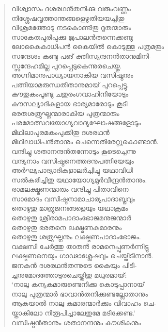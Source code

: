\begin{verse}
വിശ്വാസം ദശരഥന്‍തനിക്കു വരുംവണ്ണം\\
നിശ്ശേഷവൃത്താന്തങ്ങളെഴുതിയയച്ചിതു\\
വിശ്രമത്തോടു നടകൊണ്ടിതു ദൂതന്മാരും\\
സാകേതപുരിപുക്കു ഭൂപാലന്‍തന്നെക്കണ്ടു\\
ലോകൈകാധിപന്‍ കൈയില്‍ കൊടുത്തു പത്രമതും\\
സന്ദേശം കണ്ടു പങ് ക്തിസ്യന്ദനന്‍താനുമിനി-\\
സ്സന്ദേഹമില്ല പുറപ്പെടുകെന്നുരചെയ്തു.\\
അഗ്നിമാനുപാധ്യായനാകിയ വസിഷ്ഠനും\\
പത്നിയാമരുന്ധതിതാനുമായ് പുറപ്പെട്ടു.\\
കൗതുകംപൂണ്ടു ചതുരംഗവാഹിനിയോടും\\
കൗസല്യാദികളായ ഭാര്യമാരോടും കൂടി\\
ഭരതശത്രുഘ്നന്മാരാകിയ പുത്രന്മാരും\\
പരമോത്സവയോഗ്യവാദ്യഘോഷങ്ങളോടും\\
മിഥിലാപുരമകംപുക്കിതു ദശരഥന്‍\\
മിഥിലാധിപന്‍താനും ചെന്നെതിരേറ്റുകൊണ്ടാന്‍.\\
വന്ദിച്ചു ശതാനന്ദന്‍തന്നോടും കൂടെച്ചെന്നു\\
വന്ദ്യനാം വസിഷ്ഠനെത്തദനുപത്നിയേയും\\
അര്‍ഘ്യപാദ്യാദികളാലര്‍ച്ചിച്ചു യഥാവിധി\\
സല്‍കരിച്ചിതു യഥായോഗ്യമുര്‍വീന്ദ്രന്‍താനും.\\
രാമലക്ഷ്മണന്മാരും വന്ദിച്ചു പിതാവിനെ-\\
സാമോദം വസിഷ്ഠനാമാചാര്യപാദാബ്ജവും\\
തൊഴുതു മാത്രുജനങ്ങളെയും യഥാക്രമം\\
തൊഴുതു ശ്രീരാമപാദാംഭോജമനുജന്മാര്‍\\
തൊഴുതു ഭരതനെ ലക്ഷ്മണകുമാരനും\\
തൊഴുതു ശത്രുഘ്നനും ലക്ഷ്മണപാദാംഭോജം.\\
വക്ഷസി ചേര്‍ത്തു താതന്‍ രാമനെപ്പുണര്‍ന്നിട്ടു\\
ലക്ഷ്മണനെയും ഗാഢാശ്ലേഷവും ചെയ്തീടിനാന്‍.\\
ജനകന്‍ ദശരഥന്‍തന്നുടെ കൈയും പിടി-\\
ച്ചനുമോദത്തോടുരചെയ്തിതു മധുരമായ്:\\
‘നാലു കന്യകമാരുണ്ടെനിക്കു കൊടുപ്പാനായ്\\
നാലു പുത്രന്മാര്‍ ഭാവാന്‍തനിക്കുണ്ടല്ലോതാനും\\
ആകയാല്‍ നാലു കുമാരന്മാര്‍ക്കും വിവാഹം ചെ-\\
യ്താകിലോ നിരൂപിച്ചാലേതുമേ മടിക്കേണ്ട.’\\
വസിഷ്ഠന്‍താനും ശതാനന്ദനും കൗശികനും\\

\end{verse}
